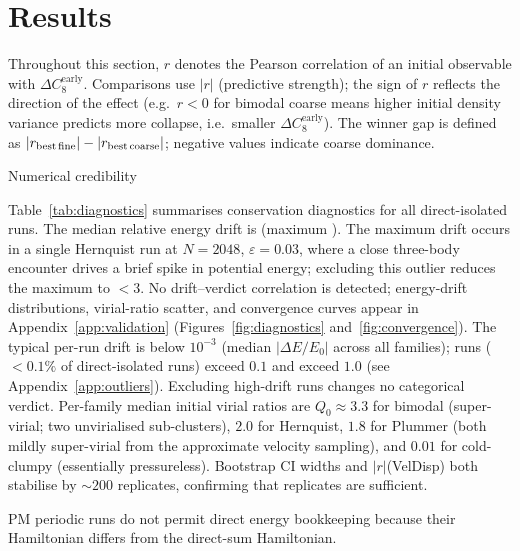 \documentclass[twocolumn,linenumbers]{aastex701}
\makeatletter
\def\subsection{\@startsection{subsection}{2}{\z@}{9pt plus 1pt minus 1pt}{4pt}%
  {\normalsize\bfseries\center}}
\newcommand{\dCearly}{\Delta C_{8}^{\mathrm{early}}}
\newcommand{\heps}{\varepsilon}
\makeatother
\begin{document}
\clearpage
\section{Results}
\label{sec:results}

Throughout this section, $r$ denotes the Pearson correlation of an
initial observable with $\dCearly$.
Comparisons use $|r|$ (predictive strength); the sign of $r$ reflects
the direction of the effect (e.g.\ $r < 0$ for bimodal coarse means
higher initial density variance predicts more collapse, i.e.\ smaller
$\dCearly$).
The winner gap is defined as $|r_{\rm best\,fine}| - |r_{\rm best\,coarse}|$;
negative values indicate coarse dominance.

\subsection{Numerical credibility}
\label{sec:results:diag}

Table~\ref{tab:diagnostics} summarises
conservation diagnostics for all direct-isolated runs.
The median relative energy drift is \EnergyDriftMedian{}
(maximum \EnergyDriftMax{}).
The maximum drift occurs in a single Hernquist run at $N = 2048$,
$\heps = 0.03$, where a close three-body encounter drives a brief spike
in potential energy; excluding this outlier reduces the maximum to $< 3$.
No drift--verdict correlation is detected; energy-drift distributions,
virial-ratio scatter, and convergence curves appear in
Appendix~\ref{app:validation}
(Figures~\ref{fig:diagnostics} and~\ref{fig:convergence}).
The typical per-run drift is below $10^{-3}$ (median $|\Delta E / E_0|$
across all families); \NOutlierDriftTenth{} runs ($<0.1\%$ of
direct-isolated runs) exceed $0.1$ and \NOutlierDriftOne{} exceed $1.0$
(see Appendix~\ref{app:outliers}).
Excluding high-drift runs changes no categorical verdict.
Per-family median initial virial ratios are $Q_0 \approx 3.3$ for bimodal
(super-virial; two unvirialised sub-clusters), $2.0$ for Hernquist,
$1.8$ for Plummer (both mildly super-virial from the approximate velocity
sampling), and $0.01$ for cold-clumpy (essentially pressureless).
Bootstrap CI widths and $|r|$(VelDisp) both stabilise by ${\sim}200$
replicates, confirming that \NReplicates{} replicates are sufficient.


PM periodic runs do not permit direct energy bookkeeping because their
Hamiltonian differs from the direct-sum Hamiltonian.
\end{document}
